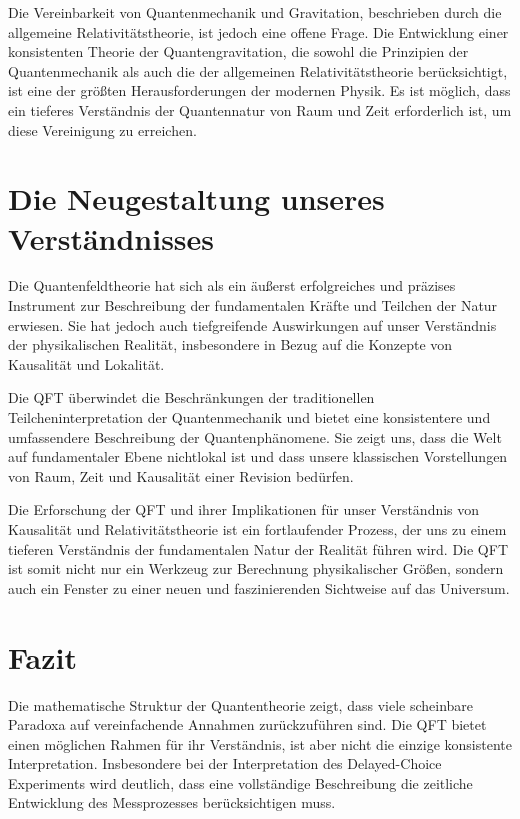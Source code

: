 \documentclass{article}
\begin{document}
	Die Vereinbarkeit von Quantenmechanik und Gravitation, beschrieben durch die allgemeine Relativitätstheorie, ist jedoch eine offene Frage.  Die Entwicklung einer konsistenten Theorie der Quantengravitation, die sowohl die Prinzipien der Quantenmechanik als auch die der allgemeinen Relativitätstheorie berücksichtigt, ist eine der größten Herausforderungen der modernen Physik.  Es ist möglich, dass ein tieferes Verständnis der Quantennatur von Raum und Zeit erforderlich ist, um diese Vereinigung zu erreichen.
	
	\section{Die Neugestaltung unseres Verständnisses}
	
	Die Quantenfeldtheorie hat sich als ein äußerst erfolgreiches und präzises Instrument zur Beschreibung der fundamentalen Kräfte und Teilchen der Natur erwiesen.  Sie hat jedoch auch tiefgreifende Auswirkungen auf unser Verständnis der physikalischen Realität, insbesondere in Bezug auf die Konzepte von Kausalität und Lokalität.
	
	Die QFT überwindet die Beschränkungen der traditionellen Teilcheninterpretation der Quantenmechanik und bietet eine konsistentere und umfassendere Beschreibung der Quantenphänomene.  Sie zeigt uns, dass die Welt auf fundamentaler Ebene nichtlokal ist und dass unsere klassischen Vorstellungen von Raum, Zeit und Kausalität einer Revision bedürfen.
	
	Die Erforschung der QFT und ihrer Implikationen für unser Verständnis von Kausalität und Relativitätstheorie ist ein fortlaufender Prozess, der uns zu einem tieferen Verständnis der fundamentalen Natur der Realität führen wird.  Die QFT ist somit nicht nur ein Werkzeug zur Berechnung physikalischer Größen, sondern auch ein Fenster zu einer neuen und faszinierenden Sichtweise auf das Universum.
	\section{Fazit}
	Die mathematische Struktur der Quantentheorie zeigt, dass viele scheinbare Paradoxa auf vereinfachende Annahmen zurückzuführen sind. Die QFT bietet einen möglichen Rahmen für ihr Verständnis, ist aber nicht die einzige konsistente Interpretation. Insbesondere bei der Interpretation des Delayed-Choice Experiments wird deutlich, dass eine vollständige Beschreibung die zeitliche Entwicklung des Messprozesses berücksichtigen muss.
\end{document}
